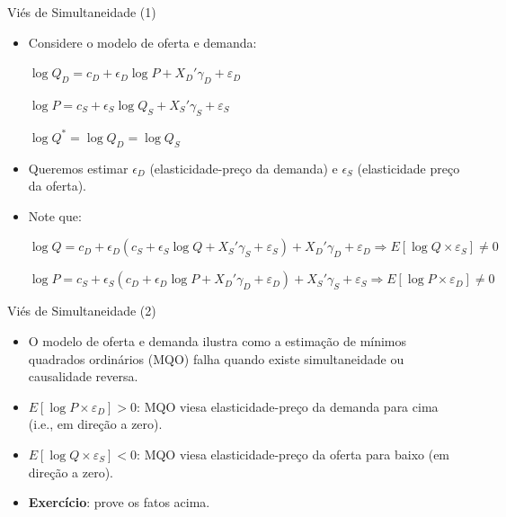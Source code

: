 \documentclass[10pt,slides,xcolor=pdftex,dvipsnames,table]{beamer}
\begin{document}
\begin{frame}{Viés de Simultaneidade (1)}

\begin{itemize}\itemsep1.2em

\item Considere o modelo de oferta e demanda:
\vspace{0.3cm}

$ \log Q_D = c_D + \epsilon_D \log P +  X_D' \gamma_D + \varepsilon_D $

\vspace{0.2cm}

$ \log P = c_S + \epsilon_S \log Q_S +  X_S' \gamma_S + \varepsilon_S $

\vspace{0.2cm}

$ \log Q^* = \log Q_D = \log Q_S $

\item Queremos estimar $\epsilon_D$ (elasticidade-preço da demanda) e $\epsilon_S$ (elasticidade preço da oferta).

\item Note que:
\vspace{0.3cm}

$  \log Q = c_D + \epsilon_D (c_S + \epsilon_S \log Q +  X_S' \gamma_S + \varepsilon_S) +  X_D' \gamma_D + \varepsilon_D \Longrightarrow E[\log Q \times \varepsilon_S] \neq 0 $

\vspace{0.3cm}

$  \log P = c_S + \epsilon_S (c_D + \epsilon_D \log P +  X_D' \gamma_D + \varepsilon_D) +  X_S' \gamma_S + \varepsilon_S \Longrightarrow E[\log P \times \varepsilon_D] \neq 0 $
        
\end{itemize}

\end{frame}


\begin{frame}{Viés de Simultaneidade (2)}

\begin{itemize}\itemsep1.2em

\item O modelo de oferta e demanda ilustra como a estimação de mínimos quadrados ordinários (MQO) falha quando existe simultaneidade ou causalidade reversa.

\item $E[\log P \times \varepsilon_D] > 0$: MQO viesa elasticidade-preço da demanda para cima (i.e., em direção a zero).

\item $E[\log Q \times \varepsilon_S] < 0$: MQO viesa elasticidade-preço da oferta para baixo (em direção a zero).

\item \textbf{Exercício}: prove os fatos acima.    
        
\end{itemize}

\end{frame}
\end{document}
